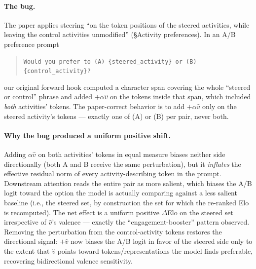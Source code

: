 \documentclass[11pt,a4paper]{article}
\begin{document}
\paragraph{The bug.}
The paper applies steering ``on the token positions of the steered
activities, while leaving the control activities unmodified''
(\S Activity preferences).  In an A/B preference prompt
\begin{quote}\small
  \texttt{Would you prefer to (A) \{steered\_activity\} or
  (B) \{control\_activity\}?}
\end{quote}
our original forward hook computed a character span covering the
whole ``steered or control'' phrase and added $+\alpha\hat{v}$ on the
tokens inside that span, which included \emph{both} activities'
tokens.  The paper-correct behavior is to add $+\alpha\hat{v}$ only on
the steered activity's tokens --- exactly one of (A) or (B) per pair,
never both.

\paragraph{Why the bug produced a uniform positive shift.}
Adding $\alpha\hat{v}$ on both activities' tokens in equal measure
biases neither side directionally (both A and B receive the same
perturbation), but it \emph{inflates} the effective residual norm of
every activity-describing token in the prompt.  Downstream attention
reads the entire pair as more salient, which biases the A/B logit
toward the option the model is actually comparing against a less
salient baseline (i.e., the steered set, by construction the set for
which the re-ranked Elo is recomputed).  The net effect is a uniform
positive $\Delta$Elo on the steered set irrespective of $\hat{v}$'s
valence --- exactly the ``engagement-booster'' pattern observed.
Removing the perturbation from the control-activity tokens restores
the directional signal: $+\hat{v}$ now biases the A/B logit in favor
of the steered side only to the extent that $\hat{v}$ points toward
tokens/representations the model finds preferable, recovering
bidirectional valence sensitivity.
\end{document}
